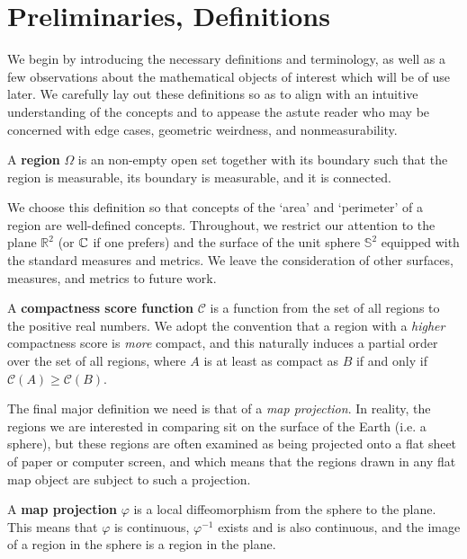 \section{Preliminaries, Definitions}\label{sec:prelims}

We begin by introducing the necessary definitions and terminology, as well as a few observations about the mathematical objects of interest which will be of use later.  We carefully lay out these definitions so as to align with an intuitive understanding of the concepts and to appease the astute reader who may be concerned with edge cases, geometric weirdness, and nonmeasurability.



\begin{definition}
A \textbf{region} $\Omega$ is an non-empty open set together with its boundary such that the region is measurable, its boundary is measurable, and it is connected.
\end{definition}

We choose this definition so that concepts of the `area' and `perimeter' of a region are well-defined concepts.  Throughout, we restrict our attention to the plane $\mathbb{R}^2$ (or $\mathbb{C}$ if one prefers) and the surface of the unit sphere $\mathbb{S}^2$ equipped with the standard measures and metrics.  We leave the consideration of other surfaces, measures, and metrics to future work.


\begin{definition}
A \textbf{compactness score function} $\mathcal{C}$ is a function from the set of all regions to the positive real numbers.  We adopt the convention that a region with a \textit{higher} compactness score is \textit{more} compact, and this naturally induces a partial order over the set of all regions, where $A$ is at least as compact as $B$ if and only if $\mathcal{C}(A)\geq \mathcal{C}(B)$.
\end{definition}

The final major definition we need is that of a \textit{map projection}.  In reality, the regions we are interested in comparing sit on the surface of the Earth (i.e. a sphere), but these regions are often examined as being projected onto a flat sheet of paper or computer screen, and which means that the regions drawn in any flat map object are subject to such a projection.

\begin{definition}
A \textbf{map projection} $\varphi$ is a local diffeomorphism from the sphere to the plane.  This means that $\varphi$ is continuous, $\varphi^{-1}$ exists and is also continuous, and the image of a region in the sphere is a region in the plane.
\end{definition}

